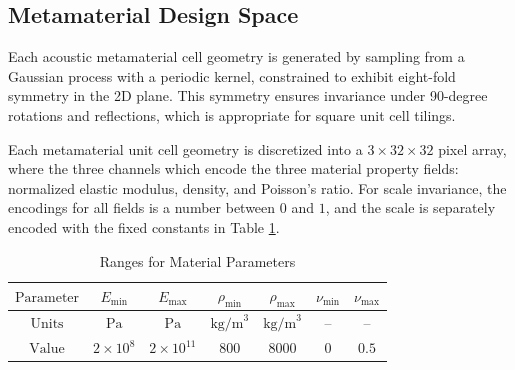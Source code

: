 \documentclass[preprint,review,12pt]{elsarticle}
\begin{document}
\subsection{Metamaterial Design Space}
\label{ssec:metamaterial_design_space}
Each acoustic metamaterial cell geometry is generated by sampling from a Gaussian process with a periodic kernel, constrained to exhibit eight-fold symmetry in the 2D plane. This symmetry ensures invariance under 90-degree rotations and reflections, which is appropriate for square unit cell tilings.

Each metamaterial unit cell geometry is discretized into a $3 \times 32 \times 32$ pixel array, where the three channels which encode the three material property fields: normalized elastic modulus, density, and Poisson's ratio. For scale invariance, the encodings for all fields is a number between $0$ and $1$, and the scale is separately encoded with the fixed constants in Table \ref{tab:parameter_ranges}.
\begin{table}[h]
  \centering
  \begin{tabular}{|c|c|c|c|c|c|c|}
    \hline
    $\text{Parameter}$ & $E_{\text{min}}$ & $E_{\text{max}}$ & $\rho_{\text{min}}$ & $\rho_{\text{max}}$ & $\nu_{\text{min}}$ & $\nu_{\text{max}}$ \\
    \hline
    $\text{Units}$ & $\text{Pa}$ & $\text{Pa}$ & $\text{kg/m}^3$ & $\text{kg/m}^3$ & -- & -- \\
    \hline
    $\text{Value}$ & $2 \times 10^8$ & $2 \times 10^{11}$ & $800$ & $8000$ & $0$ & $0.5$ \\
    \hline
  \end{tabular}
  \caption{Ranges for Material Parameters}
  \label{tab:parameter_ranges}
\end{table}
\end{document}
